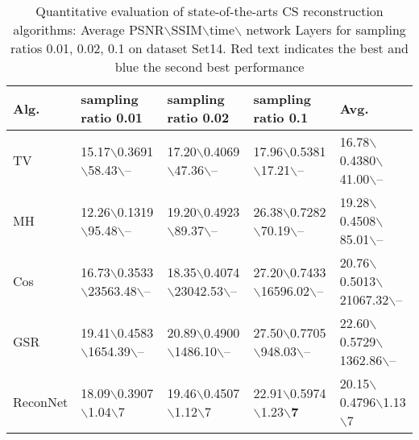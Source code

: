 \documentclass{article}
\begin{document}
\begin{table*}[!t]
\centering

    \vspace{-0.5em}\caption{Quantitative evaluation of state-of-the-arts CS reconstruction algorithms: Average PSNR$\backslash$SSIM$\backslash$time$\backslash$ network Layers for sampling ratios 0.01, 0.02, 0.1 on dataset Set14. {\color{red}Red} text indicates the best and {\color{blue}blue} the second best performance}      \label{tab:results2}
    \renewcommand\arraystretch{1.10}
    \begin{small}
    \begin{tabular}{>{\hfil}p{55pt}<{\hfil}|>{\hfil}p{98pt}<{\hfil}|>{\hfil}p{98pt}<{\hfil}|
    >{\hfil}p{98pt}<{\hfil}|>{\hfil}p{98pt}<{\hfil}}

\hline
{ Alg.} & {  sampling ratio 0.01} & {sampling ratio 0.02} & { sampling ratio 0.1} & {Avg.}      \\
    \hline
    TV~\cite{li1tval3}            & 15.17$\backslash$0.3691$\backslash$58.43$\backslash$--    &	17.20$\backslash$0.4069$\backslash$47.36$\backslash$--	& 17.96$\backslash$0.5381$\backslash$17.21$\backslash$--	&  16.78$\backslash$0.4380$\backslash$41.00$\backslash$--        \\

MH~\cite{chen2011compressed}            & 12.26$\backslash$0.1319$\backslash$95.48$\backslash$--	&   19.20$\backslash$0.4923$\backslash$89.37$\backslash$--  & 26.38$\backslash$0.7282$\backslash$70.19$\backslash$--	&  19.28$\backslash$0.4508$\backslash$85.01$\backslash$--        \\

Cos~\cite{zhang2012compressed}            & 16.73$\backslash$0.3533$\backslash$23563.48$\backslash$-- 	&	18.35$\backslash$0.4074$\backslash$23042.53$\backslash$--	& 27.20$\backslash$0.7433$\backslash$16596.02$\backslash$--    &  20.76$\backslash$0.5013$\backslash$21067.32$\backslash$--     \\

GSR~\cite{zhang2014group}            & 19.41$\backslash$0.4583$\backslash$1654.39$\backslash$-- 	&	20.89$\backslash$0.4900$\backslash$1486.10$\backslash$--	& 27.50$\backslash$0.7705$\backslash$948.03$\backslash$--	&  22.60$\backslash$0.5729$\backslash$1362.86$\backslash$--     \\
ReconNet\cite{kulkarni2016reconnet}         & 18.09$\backslash$0.3907$\backslash$1.04$\backslash$7	&	19.46$\backslash$0.4507$\backslash$1.12$\backslash$7	& 22.91$\backslash$0.5974$\backslash$1.23$\backslash$\textbf{\color{blue}7}	&  20.15$\backslash$0.4796$\backslash$1.13$\backslash$7     \\


\end{tabular}
\end{small}
\end{table*}
\end{document}
